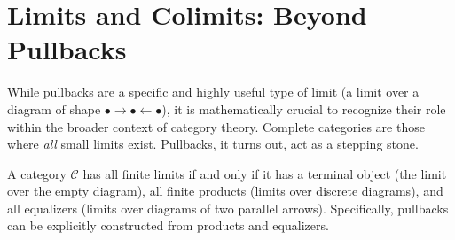 \section{Limits and Colimits: Beyond Pullbacks}

While pullbacks are a specific and highly useful type of limit (a limit over a diagram of shape $\bullet \rightarrow \bullet \leftarrow \bullet$), it is mathematically crucial to recognize their role within the broader context of category theory. Complete categories are those where \emph{all} small limits exist. Pullbacks, it turns out, act as a stepping stone.

\begin{lemma}
\label{lem:limits_from_products}
A category $\mathcal{C}$ has all finite limits if and only if it has a terminal object (the limit over the empty diagram), all finite products (limits over discrete diagrams), and all equalizers (limits over diagrams of two parallel arrows). Specifically, pullbacks can be explicitly constructed from products and equalizers.
\end{lemma}

